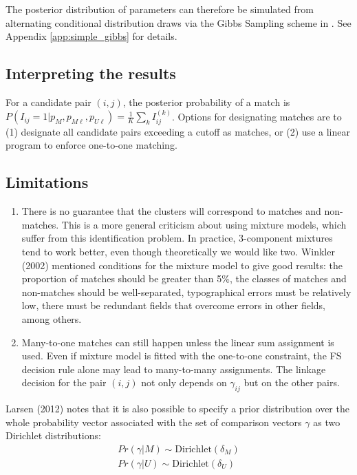 \documentclass[11pt,reqno]{amsart}
\begin{document}
The posterior distribution of parameters can therefore be simulated from alternating conditional distribution draws via the  Gibbs Sampling scheme in \cite{larsen_2005}.  See Appendix \ref{app:simple_gibbs} for details.

\subsection{Interpreting the results}  For a candidate pair $(i,j)$, the posterior probability of a match is $P(I_{ij}  = 1 | p_M, p_{M\ell}, p_{U\ell}) = \frac{1}{K}\sum_k I_{ij}^{(k)}$.  Options for designating matches are to (1) designate all candidate pairs exceeding a cutoff as matches, or (2) use a linear program to enforce one-to-one matching. 


\subsection{Limitations}
\begin{enumerate}
\item There is no guarantee that the clusters will correspond to matches and non-matches.  This is a more general criticism about using mixture models, which suffer from this identification problem.  In practice, 3-component mixtures tend to work better, even though theoretically we would like two.  Winkler (2002) mentioned conditions for the mixture model to give good results: the proportion of matches should be greater than 5\%, the classes of matches and non-matches should be well-separated, typographical errors must be relatively low, there must be redundant fields that overcome errors in other fields, among others. 
\item Many-to-one matches can still happen unless the linear sum assignment is used.  Even if mixture model is fitted with the one-to-one constraint, the FS decision rule alone may lead to many-to-many assignments.  The linkage decision for the pair $(i,j)$ not only depends on $\gamma_{ij}$ but on the other pairs. 
\end{enumerate}


 Larsen (2012) notes that it is also possible to specify a prior distribution over the whole probability vector associated with the set of comparison vectors $\gamma$ as two Dirichlet distributions:
 \begin{gather*}
  Pr(\gamma | M) \sim \text{Dirichlet}(\delta_M) \\
 Pr(\gamma | U) \sim \text{Dirichlet}(\delta_U)
 \end{gather*}
\end{document}
